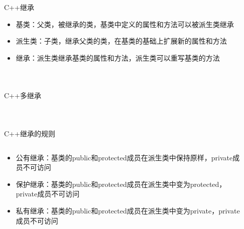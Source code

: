 \documentclass[UTF8,aspectratio=169]{beamer}
\begin{document}
\begin{frame}[fragile]{C++继承}
    \begin{itemize}
        \item 基类：父类，被继承的类，基类中定义的属性和方法可以被派生类继承
        \item 派生类：子类，继承父类的类，在基类的基础上扩展新的属性和方法
        \item 继承：派生类继承基类的属性和方法，派生类可以重写基类的方法
    \end{itemize}
    \begin{columns}
        \begin{column}{0.48\textwidth}
            \inputminted[firstline=1,lastline=16]{cpp}{code/cpp_inherit_example.cpp}
        \end{column}
        \begin{column}{0.48\textwidth}
            \inputminted[firstline=18,lastline=28]{cpp}{code/cpp_inherit_example.cpp}
        \end{column}
    \end{columns}
\end{frame}

\begin{frame}[fragile]{C++多继承}
    \begin{columns}
        \begin{column}{0.48\textwidth}
            \inputminted[firstline=1,lastline=17]{cpp}{code/cpp_multi_inherit_example.cpp}
        \end{column}
        \begin{column}{0.48\textwidth}
            \inputminted[firstline=19,lastline=33]{cpp}{code/cpp_multi_inherit_example.cpp}
        \end{column}
    \end{columns}
\end{frame}

\begin{frame}[fragile]{C++继承的规则}
    \begin{columns}
        \begin{column}{0.48\textwidth}
            \begin{itemize}
                \item 公有继承：基类的public和protected成员在派生类中保持原样，private成员不可访问
                \item 保护继承：基类的public和protected成员在派生类中变为protected，private成员不可访问
                \item 私有继承：基类的public和protected成员在派生类中变为private，private成员不可访问
            \end{itemize}
        \end{column}
        \begin{column}{0.48\textwidth}
            \inputminted[firstline=1,lastline=15]{cpp}{code/cpp_inherit_rule.cpp}
        \end{column}
    \end{columns}
\end{frame}
\end{document}
